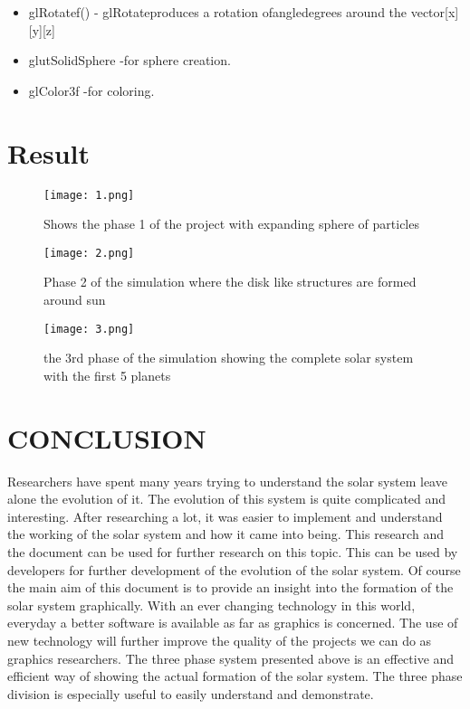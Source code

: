 \documentclass[letterpaper, 10 pt, conference]{ieeeconf}  %
\begin{document}
\begin{itemize}
\item glRotatef($ $)   - glRotateproduces a rotation ofangledegrees around the vector[x][y][z]
\item  glutSolidSphere -for sphere creation.
\item  glColor3f -for coloring.

\end{itemize}

\section{Result}

\begin{figure}[H]
  \begin{center}
    \texttt{[image: 1.png]}
  \end{center}
  \caption{Shows the phase 1 of the project with \newline expanding sphere of particles}
\end{figure}

\begin{figure}[H]
  \begin{center}
    \texttt{[image: 2.png]}
  \end{center}
  \caption{Phase 2 of the simulation where the disk  like structures are formed around sun}
\end{figure}
\begin{figure}[H]
  \begin{center}
    \texttt{[image: 3.png]}
  \end{center}
  \caption{the 3rd phase of the simulation showing the \newline complete solar system with the first 5 planets}
\end{figure}



\section{CONCLUSION}
Researchers have spent many years trying to understand the solar system leave alone the evolution of it. The evolution of this system is quite complicated and interesting. After researching a lot, it was easier to implement and understand the working of the solar system and how it came into being. This research and the document can be used for further research on this topic. This can be used by developers for further development of the evolution of the solar system. Of course the main aim of this document is to provide an insight into the formation of the solar system graphically. With an ever changing technology in this world, everyday a better software is available as far as graphics is concerned. The use of new technology will further improve the quality of the projects we can do as graphics researchers. The three phase system presented above is an effective and efficient way of showing the actual formation of the solar system. The three phase division is especially useful to easily understand and demonstrate. 
\end{document}
